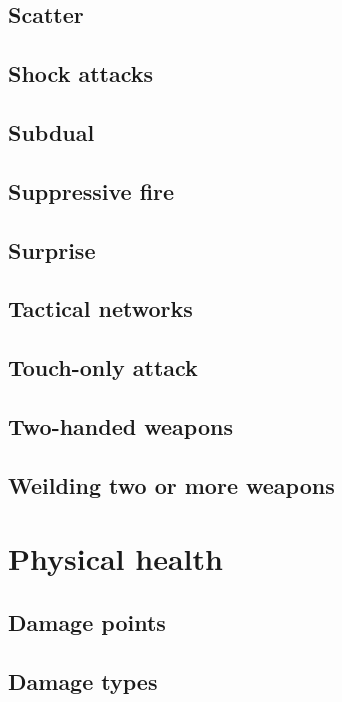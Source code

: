 \subsection{Scatter}

\subsection{Shock attacks}

\subsection{Subdual}

\subsection{Suppressive fire}

\subsection{Surprise}

\subsection{Tactical networks}

\subsection{Touch-only attack}

\subsection{Two-handed weapons}

\subsection{Weilding two or more weapons}

\section{Physical health}
\label{sec:physical-health}

\subsection{Damage points}

\subsection{Damage types}

